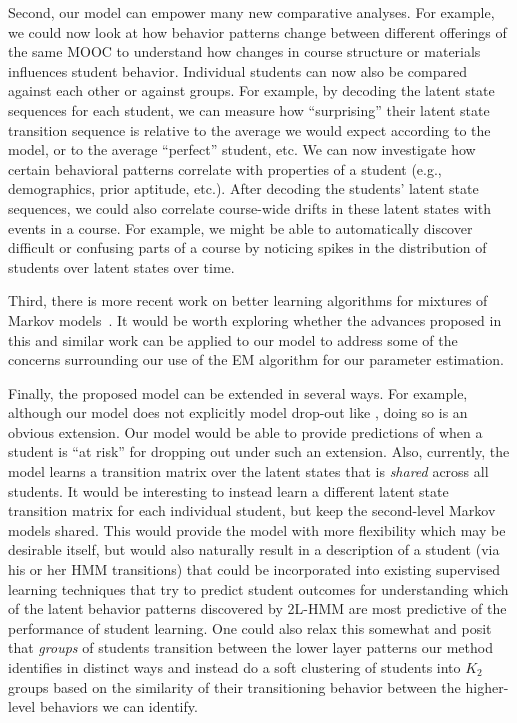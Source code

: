 Second, our model can empower many new comparative analyses. For example, we could
now look at how behavior patterns change between different offerings of
the same MOOC to understand how changes in course structure or materials
influences student behavior. Individual students can now also be compared
against each other or against groups. For example, by decoding the latent
state sequences for each student, we can measure how ``surprising'' their
latent state transition sequence is relative to the average we would expect
according to the model, or to the average ``perfect'' student, etc. We can
now investigate how certain behavioral patterns correlate with properties
of a student (e.g., demographics, prior aptitude, etc.). After decoding the
students' latent state sequences, we could also correlate course-wide
drifts in these latent states with events in a course. For example, we
might be able to automatically discover difficult or confusing parts of a
course by noticing spikes in the distribution of students over latent
states over time.

Third, there is more recent work on better learning algorithms for mixtures of
Markov models~\citep{Gupta:2016:NIPS}. It would be worth exploring whether
the advances proposed in this and similar work can be applied to our model
to address some of the concerns surrounding our use of the EM algorithm for
our parameter estimation.

Finally, the proposed model can be extended in several ways. For example, 
although our model does not explicitly model drop-out like
\citet{Kizilcec:2013:LAK}, doing so is an obvious extension. Our model
would be able to provide predictions of when a student is ``at risk'' for
dropping out under such an extension.
Also, currently, the model learns a transition matrix over the latent states that
is \emph{shared} across all students. It would be interesting to instead
learn a different latent state transition matrix for each individual
student, but keep the second-level Markov models shared. This would provide
the model with more flexibility which may be desirable itself, but would
also naturally result in a description of a student (via his or her HMM
transitions) that could be incorporated into existing supervised learning
techniques that try to predict student outcomes for understanding
which of the latent behavior patterns discovered by 2L-HMM are most predictive
of the performance of student learning. One could also relax this somewhat
and posit that \emph{groups} of students transition between the lower layer
patterns our method identifies in distinct ways and instead do a soft
clustering of students into $K_2$ groups based on the similarity of their
transitioning behavior between the higher-level behaviors we can identify.


